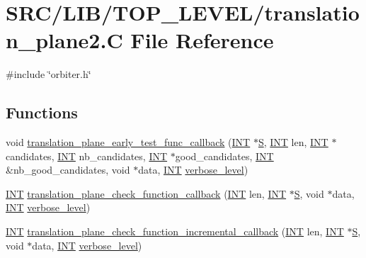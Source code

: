 \hypertarget{translation__plane2_8_c}{}\section{S\+R\+C/\+L\+I\+B/\+T\+O\+P\+\_\+\+L\+E\+V\+E\+L/translation\+\_\+plane2.C File Reference}
\label{translation__plane2_8_c}
{\ttfamily \#include \char`\"{}orbiter.\+h\char`\"{}}\newline
\subsection*{Functions}
\begin{DoxyCompactItemize}
\item 
void \mbox{\hyperlink{translation__plane2_8_c_a4c252150015dcf1e634fed722b6766be}{translation\+\_\+plane\+\_\+early\+\_\+test\+\_\+func\+\_\+callback}} (\mbox{\hyperlink{galois_8h_a09fddde158a3a20bd2dcadb609de11dc}{I\+NT}} $\ast$\mbox{\hyperlink{simeon_8_c_adab47f8243f1b5a2c31df2535d6b37d0}{S}}, \mbox{\hyperlink{galois_8h_a09fddde158a3a20bd2dcadb609de11dc}{I\+NT}} len, \mbox{\hyperlink{galois_8h_a09fddde158a3a20bd2dcadb609de11dc}{I\+NT}} $\ast$candidates, \mbox{\hyperlink{galois_8h_a09fddde158a3a20bd2dcadb609de11dc}{I\+NT}} nb\+\_\+candidates, \mbox{\hyperlink{galois_8h_a09fddde158a3a20bd2dcadb609de11dc}{I\+NT}} $\ast$good\+\_\+candidates, \mbox{\hyperlink{galois_8h_a09fddde158a3a20bd2dcadb609de11dc}{I\+NT}} \&nb\+\_\+good\+\_\+candidates, void $\ast$data, \mbox{\hyperlink{galois_8h_a09fddde158a3a20bd2dcadb609de11dc}{I\+NT}} \mbox{\hyperlink{simeon_8_c_a818073fbcc2f439e7c56952f67386122}{verbose\+\_\+level}})
\item 
\mbox{\hyperlink{galois_8h_a09fddde158a3a20bd2dcadb609de11dc}{I\+NT}} \mbox{\hyperlink{translation__plane2_8_c_a801520ddddd2cf0584b339285d489b73}{translation\+\_\+plane\+\_\+check\+\_\+function\+\_\+callback}} (\mbox{\hyperlink{galois_8h_a09fddde158a3a20bd2dcadb609de11dc}{I\+NT}} len, \mbox{\hyperlink{galois_8h_a09fddde158a3a20bd2dcadb609de11dc}{I\+NT}} $\ast$\mbox{\hyperlink{simeon_8_c_adab47f8243f1b5a2c31df2535d6b37d0}{S}}, void $\ast$data, \mbox{\hyperlink{galois_8h_a09fddde158a3a20bd2dcadb609de11dc}{I\+NT}} \mbox{\hyperlink{simeon_8_c_a818073fbcc2f439e7c56952f67386122}{verbose\+\_\+level}})
\item 
\mbox{\hyperlink{galois_8h_a09fddde158a3a20bd2dcadb609de11dc}{I\+NT}} \mbox{\hyperlink{translation__plane2_8_c_aae790edc56ca12404a0fd196d3ea9590}{translation\+\_\+plane\+\_\+check\+\_\+function\+\_\+incremental\+\_\+callback}} (\mbox{\hyperlink{galois_8h_a09fddde158a3a20bd2dcadb609de11dc}{I\+NT}} len, \mbox{\hyperlink{galois_8h_a09fddde158a3a20bd2dcadb609de11dc}{I\+NT}} $\ast$\mbox{\hyperlink{simeon_8_c_adab47f8243f1b5a2c31df2535d6b37d0}{S}}, void $\ast$data, \mbox{\hyperlink{galois_8h_a09fddde158a3a20bd2dcadb609de11dc}{I\+NT}} \mbox{\hyperlink{simeon_8_c_a818073fbcc2f439e7c56952f67386122}{verbose\+\_\+level}})

\end{DoxyCompactItemize}
